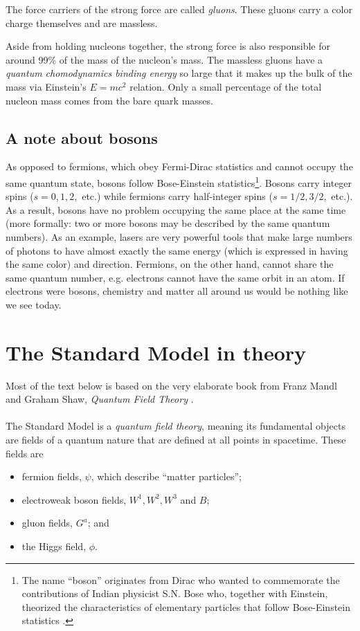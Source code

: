 The force carriers of the strong force are called \textit{gluons}. These gluons carry a color charge themselves and are massless.

Aside from holding nucleons together, the strong force is also responsible for around 99\% of the mass of the nucleon's mass. The massless gluons have a \textit{quantum chomodynamics binding energy} so large that it makes up the bulk of the mass via Einstein's $E=mc^2$ relation. Only a small percentage of the total nucleon mass comes from the bare quark masses.

\subsection{A note about bosons}
As opposed to fermions, which obey Fermi-Dirac statistics and cannot occupy the same quantum state, bosons follow Bose-Einstein statistics\footnote{The name ``boson'' originates from Dirac who wanted to commemorate the contributions of Indian physicist S.N. Bose who, together with Einstein, theorized the characteristics of elementary particles that follow Bose-Einstein statistics \cite{farmelo2009strangest}.}. Bosons carry integer spins ($s=0,1,2,$ etc.) while fermions carry half-integer spins ($s=1/2,3/2,$ etc.). As a result, bosons have no problem occupying the same place at the same time (more formally: two or more bosons may be described by the same quantum numbers). As an example, lasers are very powerful tools that make large numbers of photons to have almost exactly the same energy (which is expressed in having the same color) and direction. Fermions, on the other hand, cannot share the same quantum number, e.g. electrons cannot have the same orbit in an atom. If electrons were bosons, chemistry and matter all around us would be nothing like we see today.

\section{The Standard Model in theory}
\label{sec:sm}
Most of the text below is based on the very elaborate book from Franz Mandl and Graham Shaw, \textit{Quantum Field Theory} \cite{mandl2013quantum}.\\
\\
The Standard Model is a \textit{quantum field theory}, meaning its fundamental objects are fields of a quantum nature that are defined at all points in spacetime. These fields are
\begin{itemize}
\item fermion fields, $\psi$, which describe ``matter particles'';
\item electroweak boson fields, $W^1, W^2, W^3$ and $B$;
\item gluon fields, $G^a$; and
\item the Higgs field, $\phi$.
\end{itemize}

